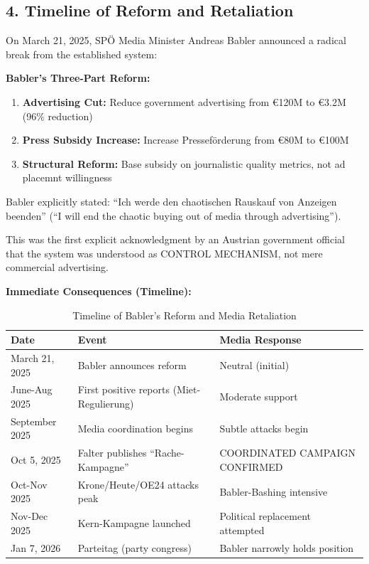\label{sec:dx-babler-experiment}

\subsection*{4. Timeline of Reform and Retaliation}

On March 21, 2025, SPÖ Media Minister Andreas Babler announced a radical break
from the established system:

\textbf{Babler's Three-Part Reform:}

\begin{enumerate}
\item \textbf{Advertising Cut:} Reduce government advertising from €120M to €3.2M (96\% reduction)
\item \textbf{Press Subsidy Increase:} Increase Presseförderung from €80M to €100M
\item \textbf{Structural Reform:} Base subsidy on journalistic quality metrics, not ad placemnt willingness
\end{enumerate}

Babler explicitly stated: ``Ich werde den chaotischen Rauskauf von Anzeigen
beenden'' (``I will end the chaotic buying out of media through advertising'').

This was the first explicit acknowledgment by an Austrian government official
that the system was understood as CONTROL MECHANISM, not mere commercial advertising.

\textbf{Immediate Consequences (Timeline):}

\begin{table}[h]
\centering
\caption{Timeline of Babler's Reform and Media Retaliation}
\label{tab:dx-babler-timeline}
\begin{tabular}{|l|l|l|}
\hline
\textbf{Date} & \textbf{Event} & \textbf{Media Response} \\
\hline
March 21, 2025 & Babler announces reform & Neutral (initial) \\
June-Aug 2025 & First positive reports (Miet-Regulierung) & Moderate support \\
September 2025 & Media coordination begins & Subtle attacks begin \\
Oct 5, 2025 & Falter publishes ``Rache-Kampagne'' & COORDINATED CAMPAIGN CONFIRMED \\
Oct-Nov 2025 & Krone/Heute/OE24 attacks peak & Babler-Bashing intensive \\
Nov-Dec 2025 & Kern-Kampagne launched & Political replacement attempted \\
Jan 7, 2026 & Parteitag (party congress) & Babler narrowly holds position \\
\hline
\end{tabular}
\end{table}

